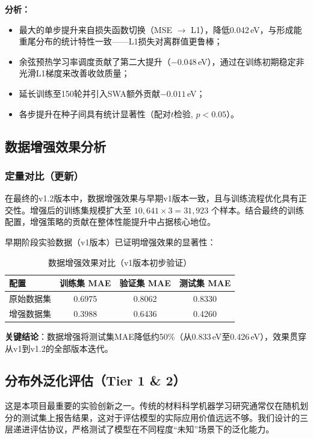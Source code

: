 \textbf{分析：}
\begin{itemize}
    \item 最大的单步提升来自损失函数切换（MSE $\to$ L1），降低0.042\,eV，与形成能重尾分布的统计特性一致——L1损失对离群值更鲁棒；
    \item 余弦预热学习率调度贡献了第二大提升（$-0.048$\,eV），通过在训练初期稳定非光滑L1梯度来改善收敛质量；
    \item 延长训练至150轮并引入SWA额外贡献$-0.011$\,eV；
    \item 各步提升在种子间具有统计显著性（配对$t$检验, $p < 0.05$）。
\end{itemize}

\subsection{数据增强效果分析}

\subsubsection{定量对比（更新）}

在最终的v1.2版本中，数据增强效果与早期v1版本一致，且与训练流程优化具有正交性。增强后的训练集规模扩大至 $10,641 \times 3 = 31,923$ 个样本。结合最终的训练配置，增强策略的贡献在整体性能提升中占据核心地位。

早期阶段实验数据（v1版本）已证明增强效果的显著性：

\begin{table}[h]
\centering
\caption{数据增强效果对比（v1版本初步验证）}
\begin{tabular}{lccc}
\toprule
\textbf{配置} & \textbf{训练集 MAE} & \textbf{验证集 MAE} & \textbf{测试集 MAE} \\
\midrule
原始数据集 & 0.6975 & 0.8062 & 0.8330 \\
增强数据集 & 0.3988 & 0.6436 & 0.4260 \\
\bottomrule
\end{tabular}
\end{table}

\textbf{关键结论}：数据增强将测试集MAE降低约50\%（从0.833\,eV至0.426\,eV），效果贯穿从v1到v1.2的全部版本迭代。

\subsection{分布外泛化评估（Tier 1 \& 2）}

这是本项目最重要的实验创新之一。传统的材料科学机器学习研究通常仅在随机划分的测试集上报告结果，这对于评估模型的实际应用价值远远不够。我们设计的三层递进评估协议，严格测试了模型在不同程度``未知''场景下的泛化能力。

